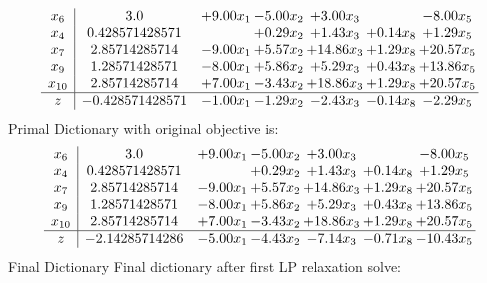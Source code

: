 \documentclass[8pt]{article}
\begin{document}
\[\begin{array}{c| c c@{\hskip 2pt} c@{\hskip 2pt} c@{\hskip 2pt} c@{\hskip 2pt} c@{\hskip 2pt} }
 x_{6}   &  3.0 & +  9.00 x_{1} & -5.00 x_{2} & +  3.00 x_{3} &   & -8.00 x_{5}\\
 x_{4}   &  0.428571428571  &   & +  0.29 x_{2} & +  1.43 x_{3} & +  0.14 x_{8} & +  1.29 x_{5}\\
 x_{7}   &  2.85714285714 & -9.00 x_{1} & +  5.57 x_{2} & + 14.86 x_{3} & +  1.29 x_{8} & + 20.57 x_{5}\\
 x_{9}   &  1.28571428571 & -8.00 x_{1} & +  5.86 x_{2} & +  5.29 x_{3} & +  0.43 x_{8} & + 13.86 x_{5}\\
 x_{10}   &  2.85714285714 & +  7.00 x_{1} & -3.43 x_{2} & + 18.86 x_{3} & +  1.29 x_{8} & + 20.57 x_{5}\\
\hline
z    &  -0.428571428571 & -1.00 x_{1} & -1.29 x_{2} & -2.43 x_{3} & -0.14 x_{8} & -2.29 x_{5}\\
\end{array}\]
Primal Dictionary with original objective is:
\[\begin{array}{c| c c@{\hskip 2pt} c@{\hskip 2pt} c@{\hskip 2pt} c@{\hskip 2pt} c@{\hskip 2pt} }
 x_{6}   &  3.0 & +  9.00 x_{1} & -5.00 x_{2} & +  3.00 x_{3} &   & -8.00 x_{5}\\
 x_{4}   &  0.428571428571  &   & +  0.29 x_{2} & +  1.43 x_{3} & +  0.14 x_{8} & +  1.29 x_{5}\\
 x_{7}   &  2.85714285714 & -9.00 x_{1} & +  5.57 x_{2} & + 14.86 x_{3} & +  1.29 x_{8} & + 20.57 x_{5}\\
 x_{9}   &  1.28571428571 & -8.00 x_{1} & +  5.86 x_{2} & +  5.29 x_{3} & +  0.43 x_{8} & + 13.86 x_{5}\\
 x_{10}   &  2.85714285714 & +  7.00 x_{1} & -3.43 x_{2} & + 18.86 x_{3} & +  1.29 x_{8} & + 20.57 x_{5}\\
\hline
z    &  -2.14285714286 & -5.00 x_{1} & -4.43 x_{2} & -7.14 x_{3} & -0.71 x_{8} & -10.43 x_{5}\\
\end{array}\]
Final Dictionary
Final dictionary after first LP relaxation solve: 
\end{document}
